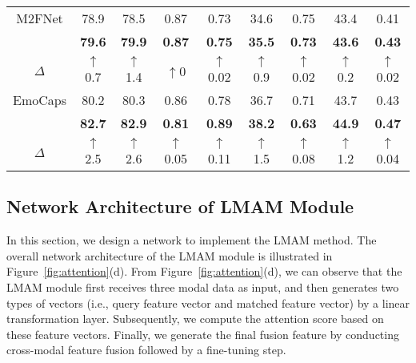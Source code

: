 {{\begin{table*}[htbp]
{\begin{tabular}{c|ccccc|ccc}
			\multicolumn{1}{c|}{M2FNet \cite{chudasama2022m2fnet}}      & 78.9  & 78.5 & 0.87 & 0.73 & 34.6  & 0.75   & 43.4   & 0.41  \\
			\rowcolor{gray!30}
			\multicolumn{1}{c|}{M2FNet$^\ast$}      & \textbf{79.6}  & \textbf{79.9} & \textbf{0.87} & \textbf{0.75} & \textbf{35.5}  & \textbf{0.73}   & \textbf{43.6 }  & \textbf{0.43}  \\ 
			$\Delta$ & \textcolor[rgb]{0.0,0.6,0.0}{$\uparrow$0.7} &  \textcolor[rgb]{0.0,0.6,0.0}{$\uparrow$1.4} &  \textcolor[rgb]{0.0,0.6,0.0}{$\uparrow$0} & \textcolor[rgb]{0.0,0.6,0.0}{$\uparrow$0.02}  & \textcolor[rgb]{0.0,0.6,0.0}{$\uparrow$0.9} &  \textcolor[rgb]{0.0,0.6,0.0}{$\uparrow$0.02} & \textcolor[rgb]{0.0,0.6,0.0}{$\uparrow$0.2} & \textcolor[rgb]{0.0,0.6,0.0}{$\uparrow$0.02} \\ \hline
			
			\multicolumn{1}{c|}{EmoCaps \cite{li2022emocaps}}     & 80.2  & 80.3 & 0.86 & 0.78 & 36.7  & 0.71   & 43.7   & 0.43  \\
			\rowcolor{gray!30}
			\multicolumn{1}{c|}{EmoCaps$^\ast$}                          & \textbf{82.7}  & \textbf{82.9} & \textbf{0.81} & \textbf{0.89} & \textbf{38.2}  & \textbf{0.63}   & \textbf{44.9}   & \textbf{0.47}  \\ $\Delta$ & \textcolor[rgb]{0.0,0.6,0.0}{$\uparrow$2.5} & \textcolor[rgb]{0.0,0.6,0.0}{$\uparrow$2.6}  & \textcolor[rgb]{0.0,0.6,0.0}{$\uparrow$0.05}  & \textcolor[rgb]{0.0,0.6,0.0}{$\uparrow$0.11}  & \textcolor[rgb]{0.0,0.6,0.0}{$\uparrow$1.5} & \textcolor[rgb]{0.0,0.6,0.0}{$\uparrow$0.08}  & \textcolor[rgb]{0.0,0.6,0.0}{$\uparrow$1.2} & \textcolor[rgb]{0.0,0.6,0.0}{$\uparrow$0.04} \\ \hline
	\end{tabular}}
\end{table*}

\subsection{Network Architecture of LMAM Module}
In this section, we design a network to implement the LMAM method. The overall network architecture of the LMAM module is illustrated in Figure~\ref{fig:attention}(d). From Figure~\ref{fig:attention}(d), we can observe that the LMAM module first receives three modal data as input, and then {generates} two types of vectors (i.e., query feature vector and matched feature vector) by a linear transformation layer. Subsequently, we compute the {attention} score based on these feature vectors. Finally, we {generate} the final fusion feature by conducting cross-modal feature fusion followed by a fine-tuning step.

}}
